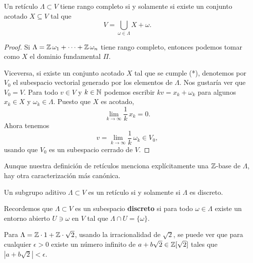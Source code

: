 \begin{lema}
  Un retículo $\Lambda \subset V$ tiene rango completo si y solamente si existe
  un conjunto acotado $X \subseteq V$ tal que
  \[ \tag{*} V = \bigcup_{\omega \in \Lambda} X + \omega. \]

  \begin{proof}
    Si $\Lambda = \mathbb{Z}\,\omega_1 + \cdots + \mathbb{Z}\,\omega_n$ tiene rango completo,
    entonces podemos tomar como $X$ el dominio fundamental $\Pi$.

    Viceversa, si existe un conjunto acotado $X$ tal que se cumple
    (*), denotemos por $V_0$ el subespacio vectorial generado por los elementos
    de $\Lambda$. Nos gustaría ver que $V_0 = V$. Para todo $v \in V$ y
    $k \in \mathbb{N}$ podemos escribir $k v = x_k + \omega_k$ para algunos $x_k \in X$
    y $\omega_k \in \Lambda$. Puesto que $X$ es acotado,
    $$\lim_{k\to\infty} \frac{1}{k}\,x_k = 0.$$
    Ahora tenemos
    $$v = \lim_{k\to\infty} \frac{1}{k}\,\omega_k \in V_0,$$
    usando que $V_0$ es un subespacio cerrado de $V$.
  \end{proof}
\end{lema}

Aunque nuestra definición de retículos menciona explícitamente una $\mathbb{Z}$-base de
$\Lambda$, hay otra caracterización más canónica.

\begin{lema}
  Un subgrupo aditivo $\Lambda \subset V$ es un retículo si y solamente
  si $\Lambda$ es discreto.
\end{lema}

Recordemos que $\Lambda \subset V$ es un subespacio \textbf{discreto} si para
todo $\omega \in \Lambda$ existe un entorno abierto $U \ni \omega$ en $V$ tal
que $\Lambda \cap U = \{ \omega \}$.

\begin{ejemplo}
  Para $\Lambda = \mathbb{Z}\cdot 1 + \mathbb{Z}\cdot \sqrt{2}$, usando la irracionalidad de
  $\sqrt{2}$, se puede ver que para cualquier $\epsilon > 0$ existe un número
  infinito de $a + b\sqrt{2} \in \mathbb{Z} [\sqrt{2}]$ tales que
  $|a + b\sqrt{2}| < \epsilon$.
\end{ejemplo}

